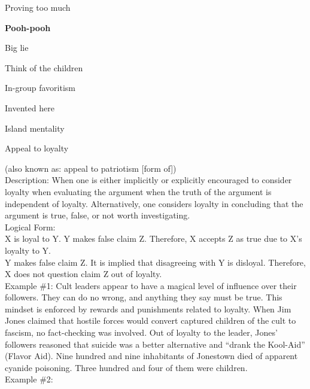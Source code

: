 \documentclass[a4paper,12pt,single,pdftex]{scrartcl}
\begin{document}
Proving too much\par \textbf{Pooh-pooh}


Big lie

Think of the children

In-group favoritism

Invented here

Island mentality

Appeal to loyalty
    
      (also known as: appeal to patriotism [form of])
    \\

  
    
      
        Description: When one is either implicitly or explicitly encouraged to consider loyalty when evaluating the argument when the truth of the argument is independent of loyalty. Alternatively, one considers loyalty in concluding that the argument is true, false, or not worth investigating.
      \\

      
        Logical Form:
      \\

      
        X is loyal to Y. \newline
Y makes false claim Z. \newline
Therefore, X accepts Z as true due to X’s loyalty to Y.
      \\

      
        Y makes false claim Z. \newline
It is implied that disagreeing with Y is disloyal. \newline
Therefore, X does not question claim Z out of loyalty.
      \\

      
        Example \#1: Cult leaders appear to have a magical level of influence over their followers. They can do no wrong, and anything they say must be true. This mindset is enforced by rewards and punishments related to loyalty. When Jim Jones claimed that hostile forces would convert captured children of the cult to fascism, no fact-checking was involved. Out of loyalty to the leader, Jones’ followers reasoned that suicide was a better alternative and “drank the Kool-Aid” (Flavor Aid). Nine hundred and nine inhabitants of Jonestown died of apparent cyanide poisoning. Three hundred and four of them were children.
      \\

      
        Example \#2: 
      \\
\end{document}
